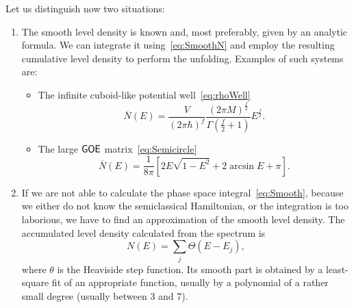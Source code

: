 \documentclass[a4paper,11pt,twoside]{article}
\begin{document}
        Let us distinguish now two situations:
        \begin{enumerate}
            \item The smooth level density is known and, most preferably, given by an analytic formula.
                We can integrate it using~\eqref{eq:SmoothN} and employ the resulting cumulative level density to perform the unfolding.
                Examples of such systems are:
                \begin{itemize}
                    \item
                        The infinite cuboid-like potential well~\eqref{eq:rhoWell}
                        \begin{equation}
                            \label{eq:NWell}
                            \overline{N}(E)
                                =\frac{V}{\left(2\pi\hbar\right)^{f}}\frac{\left(2\pi M\right)^{\frac{f}{2}}}{\Gamma\left(\frac{f}{2}+1\right)}E^{\frac{f}{2}}.
                        \end{equation}
                    \item
                        The large $\mathsf{GOE}$ matrix~\eqref{eq:Semicircle}
                        \begin{equation}
                            \label{eq:NSemicircle}
                            \overline{N}(E)
                                =\frac{1}{8\pi}\left[2E\sqrt{1-E^2}+2\arcsin{E}+\pi\right].
                        \end{equation}
                \end{itemize}

            \item
                If we are not able to calculate the phase space integral~\eqref{eq:Smooth}, because we either do not know the semiclassical Hamiltonian, or the integration is too laborious, we have to find an approximation of the smooth level density.
                The accumulated level density calculated from the spectrum is
                \begin{equation}
                    N(E)=\sum_{j}\Theta\left(E-E_{j}\right),
                \end{equation}
                where $\theta$ is the Heaviside step function.
                Its smooth part is obtained by a least-square fit of an appropriate function, usually by a polynomial of a rather small degree (usually between 3 and 7).


\end{enumerate}
\end{document}
